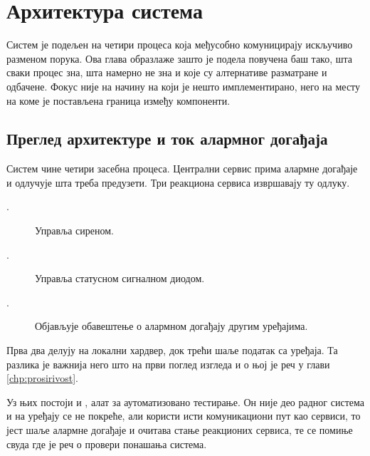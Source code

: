 \documentclass[12pt,oneside]{memoir}
\begin{document}
\chapter{Архитектура система}
\label{chp:arhitektura}
Систем је подељен на четири процеса која међусобно комуницирају искључиво разменом порука.
Ова глава образлаже зашто је подела повучена баш тако, шта сваки процес зна, шта намерно
не зна и које су алтернативе разматране и одбачене. Фокус није на начину на који је нешто
имплементирано, него на месту на коме је постављена граница између компоненти.

\section{Преглед архитектуре и ток алармног догађаја}
\label{sec:pregled-arhitekture}

Систем чине четири засебна процеса. Централни сервис  прима алармне
догађаје и одлучује шта треба предузети. Три реакциона сервиса извршавају ту одлуку.

\begin{description}
    \item[.] Управља сиреном.

    \item[.] Управља статусном сигналном диодом.

    \item[.] Објављује обавештење о алармном догађају другим
          уређајима.
\end{description}

Прва два делују на локални хардвер, док трећи шаље податак са уређаја. Та
разлика је важнија него што на први поглед изгледа и о њој је реч у глави
\ref{chp:prosirivost}.

Уз њих постоји и , алат за аутоматизовано тестирање. Он није део
радног система и на уређају се не покреће, али користи исти комуникациони пут као сервиси,
то јест шаље алармне догађаје и очитава стање реакционих сервиса, те се помиње свуда где је
реч о провери понашања система.
\end{document}
